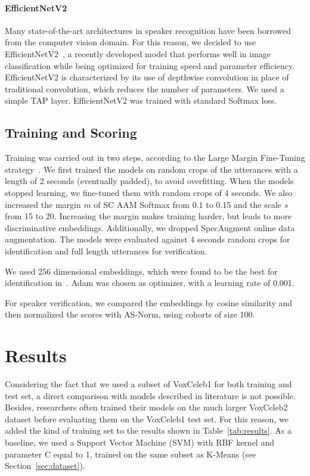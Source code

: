 \documentclass[conference]{IEEEtran}
\begin{document}
\paragraph{EfficientNetV2}

Many state-of-the-art architectures in speaker recognition have been borrowed from the computer vision domain. For this reason, we decided to use EfficientNetV2~\cite{tan2021efficientnetv2}, a recently developed model that performs well in image classification while being optimized for training speed and parameter efficiency. EfficientNetV2 is characterized by its use of depthwise convolution in place of traditional convolution, which reduces the number of parameters. We used a simple TAP layer. EfficientNetV2 was trained with standard Softmax loss.

\subsection{Training and Scoring}

Training was carried out in two steps, according to the Large Margin Fine-Tuning strategy~\cite{thienpondt2021voxsrc}. We first trained the models on random crops of the utterances with a length of 2 seconds (eventually padded), to avoid overfitting. When the models stopped learning, we fine-tuned them with random crops of 4 seconds. We also increased the margin $m$ of SC AAM Softmax from 0.1 to 0.15 and the scale $s$ from 15 to 20. Increasing the margin makes training harder, but leads to more discriminative embeddings. Additionally, we dropped SpecAugment online data augmentation. The models were evaluated against 4 seconds random crops for identification and full length utterances for verification.

We used 256 dimensional embeddings, which were found to be the best for identification in~\cite{hajibabaei2018unified}. Adam was chosen as optimizer, with a learning rate of 0.001. 

For speaker verification, we compared the embeddings by cosine similarity and then normalized the scores with AS-Norm, using cohorts of size 100.

\section{Results}
\label{sec:results}

Considering the fact that we used a subset of VoxCeleb1 for both training and test set, a direct comparison with models described in literature is not possible. Besides, researchers often trained their models on the much larger VoxCeleb2 dataset before evaluating them on the VoxCeleb1 test set. For this reason, we added the kind of training set to the results shown in Table~\ref{tab:results}. As a baseline, we used a Support Vector Machine (SVM) with RBF kernel and parameter C equal to 1, trained on the same subset as K-Means (see Section~\ref{sec:dataset}).
\end{document}
